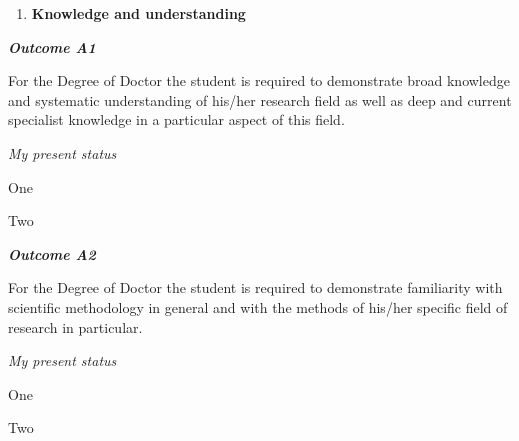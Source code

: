 \begin{enumerate}[label=\textbf{\Alph*.}]
\item \textbf{Knowledge and understanding}
\end{enumerate}

\hfill\begin{minipage}{\dimexpr\textwidth-1cm}
\noindent \textbf{\emph{Outcome A1}}

\noindent For the Degree of Doctor the student is required to demonstrate broad knowledge and systematic understanding of his/her research field as well as deep and current specialist knowledge in a particular aspect of this field.\\

\xdef\tpd{\the\prevdepth}

\end{minipage}

\noindent \emph{My present status}
\begin{outcomes}
    \item One
    \item Two
\end{outcomes}
















\vspace{1em}
\hfill\begin{minipage}{\dimexpr\textwidth-1cm}
\noindent \textbf{\emph{Outcome A2}}

\noindent For the Degree of Doctor the student is required to demonstrate familiarity with scientific methodology in general and with the methods of his/her specific field of research in particular.\\

\xdef\tpd{\the\prevdepth}

\end{minipage}

\noindent \emph{My present status}
\begin{outcomes}
    \item One
    \item Two
\end{outcomes}

















